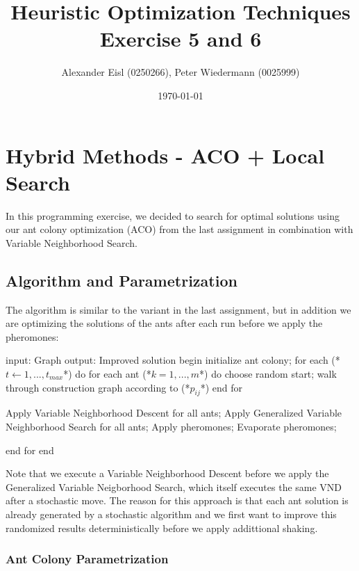 \documentclass{scrartcl}
\author{Alexander Eisl (0250266), Peter Wiedermann (0025999)}
\date{\today}
\title{Heuristic Optimization Techniques \\ Exercise 5 and 6}
\begin{document}
\maketitle


\section{Hybrid Methods - ACO + Local Search}
\label{sec:hybdrin_methods}

In this programming exercise, we decided to search for optimal
solutions using our ant colony optimization (ACO) from the last assignment
in combination with Variable Neighborhood Search.

\subsection{Algorithm and Parametrization}

The algorithm is similar to the variant in the last assignment, but in
addition we are optimizing the solutions of
the ants after each run before we apply the pheromones:

\begin{algorithm}[caption={Ant Colony - VNS Hybrid}]
    input: Graph 
    output: Improved solution
    begin
        initialize ant colony;
        for each (*$t \leftarrow 1,...,t_{max}$*) do
      	    for each ant (*$k = 1,...,m$*) do
               choose random start;
               walk through construction graph according to (*$p_{ij}$*)
            end for

            Apply Variable Neighborhood Descent for all ants;
            Apply Generalized Variable Neighborhood Search for all ants;
            Apply pheromones;
            Evaporate pheromones;

        end for
    end
\end{algorithm}

Note that we execute a Variable Neighborhood Descent before we apply the 
Generalized Variable Neigborhood Search, which itself executes the 
same VND after a stochastic move.
The reason for this approach is that each ant solution is already generated by a stochastic algorithm 
and we first want to improve this randomized results deterministically before we apply addittional 
shaking.

\subsubsection{Ant Colony Parametrization}
\label{ant_colony}
\end{document}
